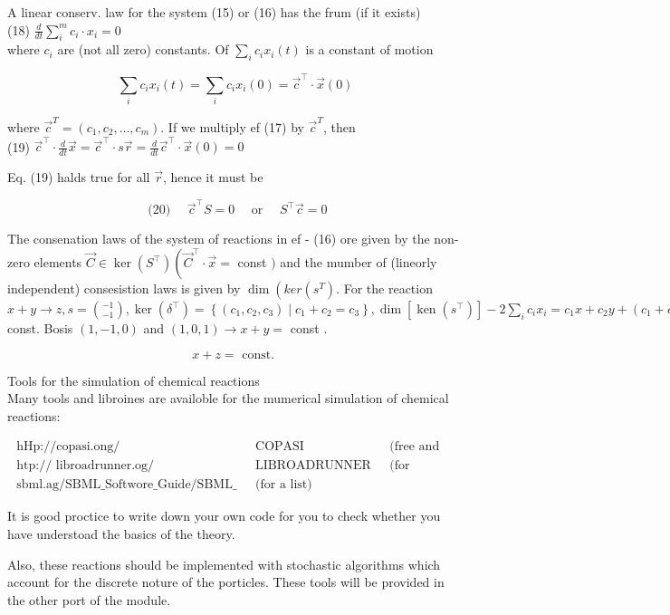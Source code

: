 \documentclass[10pt]{article}
\begin{document}
A linear conserv. law for the system (15) or (16) has the frum (if it exists)\\
(18) $\frac{d}{d t} \sum_{i}^{m} c_{i} \cdot x_{i}=0$\\
where $c_{i}$ are (not all zero) constants. Of $\sum_{i} c_{i} x_{i}(t)$ is a constant of motion

$$
\sum_{i} c_{i} x_{i}(t)=\sum_{i} c_{i} x_{i}(0)=\vec{c}^{\top} \cdot \vec{x}(0)
$$

where $\vec{c}^{T}=\left(c_{1}, c_{2}, \ldots, c_{m}\right)$. If we multiply ef (17) by $\vec{c}^{T}$, then\\
(19) $\vec{c}^{\top} \cdot \frac{d}{d t} \vec{x}=\vec{c}^{\top} \cdot s \vec{r}=\frac{d}{d t} \vec{c}^{\top} \cdot \vec{x}(0)=0$

Eq. (19) halds true for all $\vec{r}$, hence it must be

$$
\text { (20) } \quad \vec{c}^{\top} S=0 \quad \text { or } \quad S^{\top} \vec{c}=0
$$

The consenation laws of the system of reactions in ef - (16) ore given by the non-zero elements $\vec{C} \in \operatorname{ker}\left(S^{\top}\right)\left(\vec{C}^{\top} \cdot \vec{x}=\right.$ const $)$ and the mumber of (lineorly independent) consesistion laws is given by $\operatorname{dim}\left(k e r\left(s^{T}\right)\right.$. For the reaction $x+y \rightarrow z, s=\binom{-1}{-1}, \operatorname{ker}\left(\delta^{\top}\right)=\left\{\left(c_{1}, c_{2}, c_{3}\right) \mid c_{1}+c_{2}=c_{3}\right\}, \operatorname{dim}\left[\operatorname{ken}\left(s^{\top}\right)\right]-2 \sum_{i} c_{i} x_{i}=c_{1} x+c_{2} y+\left(c_{1}+c_{2}\right) z=$ const. Bosis $(1,-1,0)$ and $(1,0,1) \rightarrow x+y=$ const .

$$
x+z=\text { const. }
$$

Tools for the simulation of chemical reactions\\
Many tools and libroines are availoble for the mumerical simulation of chemical reactions:

$$
\begin{array}{lll}
\text { hHp://copasi.ong/ } & \text { COPASI } & \text { (free and professional) } \\
\text { htp:// libroadrunner.og/ } & \text { LIBROADRUNNER } & \text { (for c++/Python) } \\
\text { sbml.ag/SBML_Softwore_Guide/SBML_ Softwore_Summary } & \text { (for a list) }
\end{array}
$$

It is good proctice to write down your own code for you to check whether you have understoad the basics of the theory.

Also, these reactions should be implemented with stochastic algorithms which account for the discrete noture of the porticles. These tools will be provided in the other port of the module.
\end{document}
